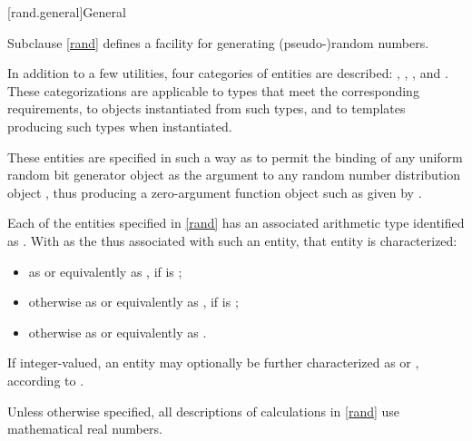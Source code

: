 [rand.general]{General}

%
%
%
%

\pnum
Subclause \ref{rand} defines a facility
for generating (pseudo-)random numbers.

\pnum
In addition to a few utilities,
four categories of entities are described:
,
,
,
and
.
These categorizations are applicable
to types that meet the corresponding requirements,
to objects instantiated from such types,
and to templates producing such types when instantiated.
\begin{note}
 These entities are specified in such a way
 as to permit the binding
 of any uniform random bit generator object 
 as the argument
 to any random number distribution object ,
 thus producing a zero-argument function object
 such as given by
 .
\end{note}

\pnum
{}%
Each of the entities specified in \ref{rand}
has an associated arithmetic type
identified as .
With  as the 
thus associated with such an entity,
that entity is characterized:
\begin{itemize}
 \item
   as  or equivalently as ,
   if  is ;
 \item
   otherwise
   as  or equivalently as ,
   if  is ;
 \item
   otherwise
   as  or equivalently as .
\end{itemize}
\noindent
If integer-valued,
an entity may optionally be further characterized as
 or ,
according to .

\pnum
Unless otherwise specified,
all descriptions of calculations
in \ref{rand}
use mathematical real numbers.

